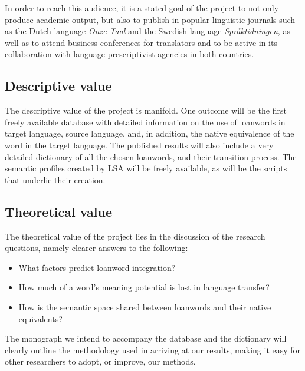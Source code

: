 \documentclass[a4paper]{article}
\begin{document}
In order to reach this audience, it is a stated goal of the project to not only produce academic output, but also to publish in popular linguistic journals such as the Dutch-language \emph{Onze Taal} and the Swedish-language \emph{Spr\aa ktidningen}, as well as to attend business conferences for translators and to be active in its collaboration with language prescriptivist agencies in both countries. 

\subsection{Descriptive value}
The descriptive value of the project is manifold. One outcome will be the first freely available database with detailed information on the use of loanwords in target language, source language, and, in addition, the native equivalence of the word in the target language. The published results will also include a very detailed dictionary of all the chosen loanwords, and their transition process. The semantic profiles created by LSA will be freely available, as will be the scripts that underlie their creation. 



\subsection{Theoretical value}
The theoretical value of the project lies in the discussion of the research questions, namely clearer answers to the following:
\begin{itemize}
	\item What factors predict loanword integration?
	\item How much of a word's meaning potential is lost in language transfer?
	\item How is the semantic space shared between loanwords and their native equivalents?	
\end{itemize}

The monograph we intend to accompany the database and the dictionary will clearly outline the methodology used in arriving at our results, making it easy for other researchers to adopt, or improve, our methods.


\end{document}
